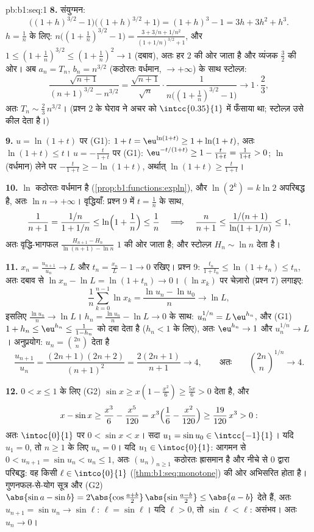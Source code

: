 \begin{solution}{pb:b1:seq:1}
\textbf{8.} संयुग्मन:
\[
\bigl((1+h)^{3/2} - 1\bigr)\bigl((1+h)^{3/2} + 1\bigr)
= (1+h)^3 - 1 = 3h + 3h^2 + h^3 .
\]
$h = \frac1n$ के लिए: $n\bigl((1 + \frac1n)^{3/2} - 1\bigr) = \frac{3 + 3/n
+ 1/n^2}{(1 + 1/n)^{3/2} + 1}$, और $1 \leq (1 + \frac1n)^{3/2} \leq (1 +
\frac1n)^2 \to 1$ (दबाव), अतः हर $2$ की ओर जाता है और व्यंजक $\frac32$ की
ओर। अब $a_n = T_n$, $b_n = n^{3/2}$ (कठोरतः वर्धमान, $\to +\infty$) के साथ
स्टोल्ज़:
\[
\frac{\sqrt{n+1}}{(n+1)^{3/2} - n^{3/2}}
= \frac{\sqrt{n+1}}{\sqrt n} \cdot
\frac{1}{n\bigl((1 + \frac1n)^{3/2} - 1\bigr)}
\longrightarrow 1 \cdot \frac{2}{3},
\]
अतः $T_n \sim \frac23\,n^{3/2}$। (प्रश्न 2 के घेराव ने अचर को
$\intcc{0.35}{1}$ में फँसाया था; स्टोल्ज़ उसे कील देता है।)

\textbf{9.} $u = \ln(1+t)$ पर (G1): $1 + t = \eu^{\ln(1+t)} \geq 1 +
\ln(1+t)$, अतः $\ln(1+t) \leq t$। $u = -\frac{t}{1+t}$ पर (G1):
$\eu^{-t/(1+t)} \geq 1 - \frac{t}{1+t} = \frac{1}{1+t} > 0$; $\ln$ (वर्धमान)
लेने पर $-\frac{t}{1+t} \geq -\ln(1+t)$, अर्थात् $\ln(1+t) \geq
\frac{t}{1+t}$।

\textbf{10.} $\ln$ कठोरतः वर्धमान है (\cref{prop:b1:functions:expln}), और
$\ln(2^k) = k\ln 2$ अपरिबद्ध है, अतः $\ln n \to +\infty$। वृद्धियाँ: प्रश्न
9 में $t = \frac1n$ के साथ,
\[
\frac 1{n+1} = \frac{1/n}{1 + 1/n} \leq
\ln\Bigl(1 + \frac1n\Bigr) \leq \frac1n
\quad\Longrightarrow\quad
\frac{n}{n+1} \leq \frac{1/(n+1)}{\ln(1 + 1/n)} \leq 1 ,
\]
अतः वृद्धि-भागफल $\frac{H_{n+1} - H_n}{\ln(n+1) - \ln n}$ $1$ की ओर जाता है;
और स्टोल्ज़ $H_n \sim \ln n$ देता है।

\textbf{11.} $x_n = \frac{u_{n+1}}{u_n} \to L$ और $t_n = \frac{x_n}{L} - 1
\to 0$ रखिए। प्रश्न 9: $\frac{t_n}{1 + t_n} \leq \ln(1 + t_n) \leq t_n$, अतः
दबाव से $\ln x_n - \ln L = \ln(1 + t_n) \to 0$। $(\ln x_k)$ पर चेज़ारो
(प्रश्न 7) लगाइए:
\[
\frac1n \sum_{k=0}^{n-1} \ln x_k = \frac{\ln u_n - \ln u_0}{n}
\longrightarrow \ln L ,
\]
इसलिए $\frac{\ln u_n}{n} \to \ln L$। $h_n = \frac{\ln u_n}{n} - \ln L \to 0$
के साथ: $u_n^{1/n} = L\,\eu^{h_n}$, और (G1) $1 + h_n \leq \eu^{h_n} \leq
\frac{1}{1 - h_n}$ को दबा देता है ($h_n < 1$ के लिए), अतः $\eu^{h_n} \to 1$
और $u_n^{1/n} \to L$। अनुप्रयोग: $u_n = \binom{2n}{n}$ देता है
\[
\frac{u_{n+1}}{u_n} = \frac{(2n+1)(2n+2)}{(n+1)^2}
= \frac{2(2n+1)}{n+1} \longrightarrow 4 ,
\qquad\text{अतः}\qquad
\binom{2n}{n}^{1/n} \to 4 .
\]

\textbf{12.} $0 < x \leq 1$ के लिए (G2) $\sin x \geq x(1 - \frac{x^2}{6})
\geq \frac{5x}{6} > 0$ देता है, और
\[
x - \sin x \geq \frac{x^3}{6} - \frac{x^5}{120}
= x^3\Bigl(\frac16 - \frac{x^2}{120}\Bigr)
\geq \frac{19}{120}\,x^3 > 0 :
\]
अतः $\intoc{0}{1}$ पर $0 < \sin x < x$। सदा $u_1 = \sin u_0 \in
\intcc{-1}{1}$। यदि $u_1 = 0$, तो $n \geq 1$ के लिए $u_n = 0$। यदि $u_1 \in
\intoc{0}{1}$: आगमन से $0 < u_{n+1} = \sin u_n < u_n \leq 1$, अतः
$(u_n)_{n\geq1}$ कठोरतः ह्रासमान है और नीचे से $0$ द्वारा परिबद्ध: वह किसी
$\ell \in \intco{0}{1}$ (\cref{thm:b1:seq:monotone}) की ओर अभिसरित होता है।
गुणनफल-से-योग सूत्र और (G2) $\abs{\sin a - \sin b} = 2\abs{\cos
\frac{a+b}{2}}\,\abs{\sin\frac{a-b}{2}} \leq \abs{a - b}$ देते हैं, अतः
$u_{n+1} = \sin u_n \to \sin \ell$: $\ell = \sin\ell$। यदि $\ell > 0$, तो
$\sin\ell < \ell$: असंभव। अतः $u_n \to 0$।


\end{solution}
